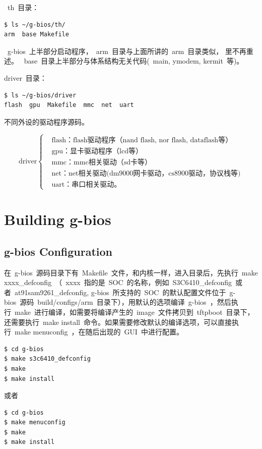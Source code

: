 \documentclass[a4paper,11pt]{book}
\begin{document}
~th~目录：
\begin{lstlisting}[language={SH}]
$ ls ~/g-bios/th/
arm  base Makefile
\end{lstlisting}
~g-bios~上半部分启动程序，~arm~目录与上面所讲的~arm~目录类似， 里不再重述。
~base~目录上半部分与体系结构无关代码(~main, ymodem, kermit~等)。

driver~目录：
\begin{lstlisting}[language=bash, numbers=none]
$ ls ~/g-bios/driver
flash  gpu  Makefile  mmc  net  uart
\end{lstlisting}
不同外设的驱动程序源码。

\begin{equation*}
\text{driver}
\left\{
	\begin{aligned}
	&\text{flash：flash驱动程序（nand flash, nor flash, dataflash等）}\\
	&\text{gpu：显卡驱动程序（lcd等）}\\
	&\text{mmc：mmc相关驱动（sd卡等）}\\
	&\text{net：net相关驱动(dm9000网卡驱动，cs8900驱动，协议栈等)}\\
	&\text{uart：串口相关驱动。}
	\end{aligned}
\right.
\end{equation*}

\chapter{Building g-bios}
\section{g-bios Configuration}
在~g-bios~源码目录下有~Makefile~文件，和内核一样，进入目录后，先执行~make xxxx\_defconfig~（~xxxx~指的是~SOC~的名称，例如~S3C6410\_defconfig~或者~at91sam9261\_defconfig, g-bios~所支持的~SOC~的默认配置文件位于~g-bios~源码~build/configs/arm~目录下），用默认的选项编译~g-bios~，然后执行~make~进行编译，如需要将编译产生的~image~文件拷贝到~tftpboot~目录下，还需要执行~make install~命令。如果需要修改默认的编译选项，可以直接执行~make menuconfig~，在随后出现的~GUI~中进行配置。
\begin{lstlisting}[language=bash, numbers=none]
$ cd g-bios
$ make s3c6410_defconfig
$ make
$ make install
\end{lstlisting}
或者
\begin{lstlisting}[language=bash, numbers=none]
$ cd g-bios
$ make menuconfig
$ make
$ make install
\end{lstlisting}
\end{document}
